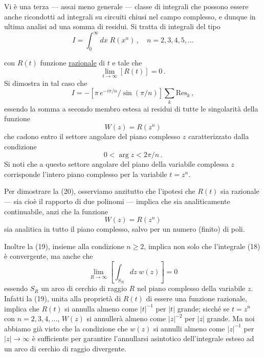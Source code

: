 \documentclass[11pt, a4paper]{book}
\numberwithin{equation}{section}
\begin{document}
Vi è una terza — assai meno generale — classe di integrali che possono essere anche ricondotti ad integrali su circuiti chiusi nel campo complesso, e dunque in ultima analisi ad una somma di residui. Si tratta di integrali del tipo
\begin{equation}
I = \int_0^{\infty} dx\; R(x^n)\,, \quad n = 2, 3, 4, 5, \ldots \tag{18}
\end{equation}

con $R(t)$ funzione \underline{razionale} di $t$ e tale che
\begin{equation}
\lim_{t \to \infty} \left[R(t)\right] = 0\,. \tag{19}
\end{equation}
Si dimostra in tal caso che
\begin{equation}
I = -\left[\pi\,e^{-i\pi/n} \big/ \sin(\pi/n)\right] \sum_k \mathrm{Res}_k\,, \tag{20}
\end{equation}
essendo la somma a secondo membro estesa ai residui di tutte le singolarità della funzione
\begin{equation}
W(z) = R(z^n) \tag{21}
\end{equation}
che cadono entro il settore angolare del piano complesso $z$ caratterizzato dalla condizione
\begin{equation}
0 < \arg z < 2\pi/n\,. \tag{22}
\end{equation}
Si noti che a questo settore angolare del piano della variabile complessa $z$ corrisponde l'intero piano complesso per la variabile $t = z^n$.

Per dimostrare la (20), osserviamo anzitutto che l'ipotesi che $R(t)$ sia razionale — sia cioè il rapporto di due polinomi — implica che sia analiticamente continuabile, anzi che la funzione
\[
W(z) = R(z^n)
\]
sia analitica in tutto il piano complesso, salvo per un numero (finito) di poli.

Inoltre la (19), insieme alla condizione $n \geq 2$, implica non solo che l'integrale (18) è convergente, ma anche che
\[
\lim_{R \to \infty} \left[\int_{S_R} dz\; w(z)\right] = 0
\]
essendo $S_R$ un arco di cerchio di raggio $R$ nel piano complesso della variabile $z$. Infatti la (19), unita alla proprietà di $R(t)$ di essere una funzione razionale, implica che $R(t)$ si annulla almeno come $|t|^{-1}$ per $|t|$ grande; sicché se $t = z^n$ con $n = 2, 3, 4, \ldots$, $W(z)$ si annullerà almeno come $|z|^{-2}$ per $|z|$ grande. Ma noi abbiamo già visto che la condizione che $w(z)$ si annulli almeno come $|z|^{-1}$ per $|z| \to \infty$ è sufficiente per garantire l'annullarsi asintotico dell'integrale esteso ad un arco di cerchio di raggio divergente.
\end{document}
